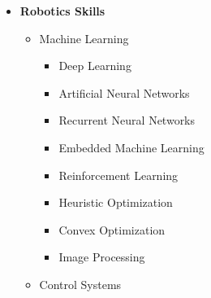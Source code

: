 \documentclass[12pt]{article}
\begin{document}
\begin{itemize}
\begin{itemize}
		\item \textbf{Simulation Tools:}
		\begin{multicols}{2}
			\begin{itemize}
				\item Gazebo
				\item MuJoCo
			\end{itemize}
		\end{multicols}
	\end{itemize}
	\item \textbf{Robotics Skills}
	\begin{itemize}
		\item Machine Learning
		\begin{multicols}{2}
			\begin{itemize}
				\item Deep Learning
				\item Artificial Neural Networks
				\item Recurrent Neural Networks
				\item Embedded Machine Learning
				\item Reinforcement Learning
				\item Heuristic Optimization
				\item Convex Optimization
				\item Image Processing
			\end{itemize}
		\end{multicols}
		\item Control Systems
		\begin{multicols}{3}
			\begin{itemize}

\end{itemize}
\end{multicols}
\end{itemize}
\end{itemize}
\end{document}
